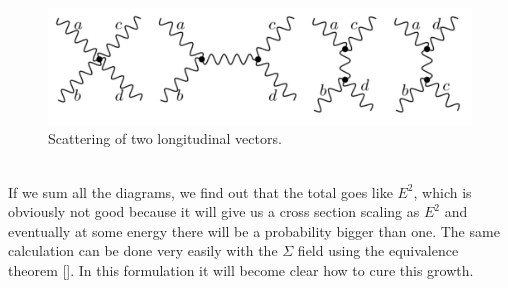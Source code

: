 \documentclass[../main.tex]{subfiles}
\begin{document}
\begin{figure}[h]
    \centering
    \includegraphics{Images/abcd.pdf}
    \caption{Scattering of two longitudinal vectors.}
    \label{fig:my_label}
\end{figure}\\
If we sum all the diagrams, we find out that the total goes like $E^2$, which is obviously not good because it will give us a cross section scaling as $E^2$ and eventually at some energy there will be a probability bigger than one. The same calculation can be done very easily with the $\Sigma$ field using the equivalence theorem []. In this formulation it will become clear how to cure this growth. 
\end{document}
